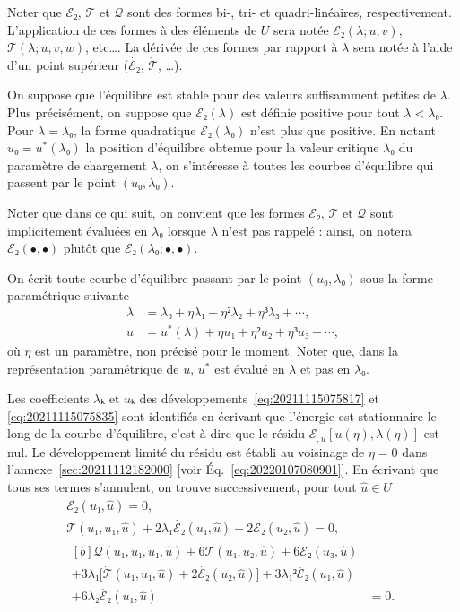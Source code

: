 \documentclass[12pt, final]{amsart}
\begin{document}
Noter que \(ℰ₂\), \(𝒯\) et \(𝒬\) sont des formes bi-, tri- et quadri-linéaires,
respectivement. L'application de ces formes à des éléments de \(U\) sera notée
\(ℰ₂(λ; u, v)\), \(𝒯(λ; u, v, w)\), etc\dots. La dérivée de ces formes par
rapport à \(λ\) sera notée à l'aide d'un point supérieur (\(\dot{ℰ₂}\),
\(\dot{𝒯}\), \dots).

On suppose que l'équilibre est stable pour des valeurs suffisamment petites de
\(λ\). Plus précisément, on suppose que \(ℰ₂(λ)\) est définie positive pour tout
\(λ<λ₀\). Pour \(λ=λ₀\), la forme quadratique \(ℰ₂(λ₀)\) n'est plus que
positive. En notant \(u₀=u^*(λ₀)\) la position d'équilibre obtenue pour la
valeur critique \(λ₀\) du paramètre de chargement \(λ\), on s'intéresse à
toutes les courbes d'équilibre qui passent par le point \((u₀, λ₀)\).

Noter que dans ce qui suit, on convient que les formes \(ℰ₂\), \(𝒯\) et \(𝒬\)
sont implicitement évaluées en \(λ₀\) lorsque \(λ\) n'est pas rappelé : ainsi,
on notera \(ℰ₂(•, •)\) plutôt que \(ℰ₂(λ₀; •, •)\).

On écrit toute courbe d'équilibre passant par le point \((u₀, λ₀)\) sous la
forme paramétrique suivante
\begin{align}
  \label{eq:20211115075817}
  λ&=λ₀+ηλ₁+η²λ₂+η³λ₃+\cdots,\\
  \label{eq:20211115075835}
  u&=u^*(λ)+η u₁+η² u₂+η³u₃+\cdots,
\end{align}
où \(η\) est un paramètre, non précisé pour le moment. Noter que, dans la
représentation paramétrique de \(u\), \(u^*\) est évalué en \(λ\) et pas en
\(λ₀\).

Les coefficients \(λ ₖ\) et \(uₖ\) des développements~\eqref{eq:20211115075817}
et \eqref{eq:20211115075835} sont identifiés en écrivant que l'énergie est
stationnaire le long de la courbe d'équilibre, c'est-à-dire que le résidu
\(ℰ_{,u}[u(η), λ(η)]\) est nul. Le développement limité du résidu est établi au
voisinage de \(η=0\) dans l'annexe~\ref{sec:20211112182000} [voir
Éq.~\eqref{eq:20220107080901}]. En écrivant que tous ses termes s'annulent, on
trouve successivement, pour tout \(\hat{u}∈ U\)
\begin{gather}
  \label{eq:20211112182917}
  ℰ₂(u₁, \hat{u})=0,\\
  \label{eq:20211112183220}
  𝒯(u₁, u₁, \hat{u})+2λ₁\dot{ℰ₂}(u₁, \hat{u})+2ℰ₂(u₂, \hat{u})=0,\\
  \begin{aligned}[b]
    𝒬(u₁, u₁, u₁, \hat{u})+6𝒯(u₁, u₂, \hat{u})+6ℰ₂(u₃, \hat{u})&\\
    +3λ₁\bigl[\dot{𝒯}(u₁, u₁, \hat{u})+2\dot{ℰ₂}(u₂, \hat{u})\bigr]
    +3λ₁²\ddot{ℰ₂}(u₁, \hat{u})&\\
    +6λ₂\dot{ℰ₂}(u₁, \hat{u})&=0.
  \end{aligned}
\end{gather}
\end{document}
